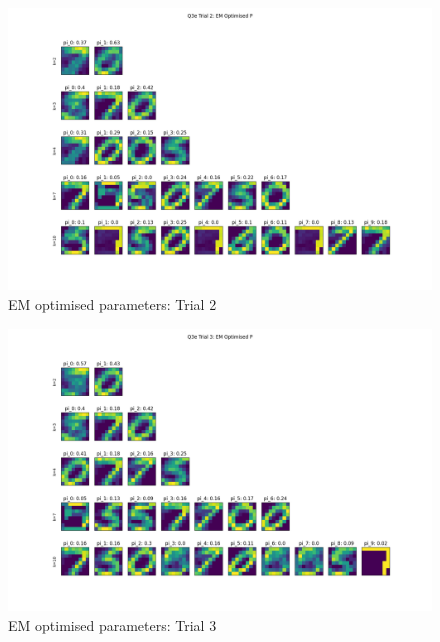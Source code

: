 \documentclass[12pt]{article}
\begin{document}
\begin{enumerate}
{\begin{figure}[h]
  \centering
  \includegraphics[scale=0.3]{outputs/q3/q3e-2-optimised-p}
  \caption{EM optimised parameters: Trial 2}
  \label{fig:3e-initialised-p-trial-2}
\end{figure}
\begin{figure}[h]
  \centering
  \includegraphics[scale=0.3]{outputs/q3/q3e-3-optimised-p}
  \caption{EM optimised parameters: Trial 3}
  \label{fig:3e-initialised-p-trial-3}
\end{figure}



}
\end{enumerate}
\end{document}
